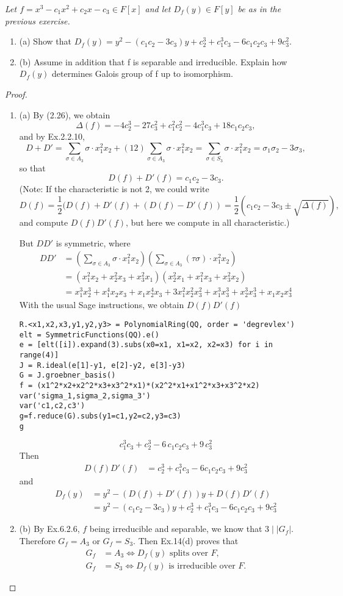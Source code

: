 \documentclass[11pt,a4paper]{article}
\newcommand{\be} {\begin{enumerate}}
\newcommand{\ee} {\end{enumerate}}
\begin{document}
{\it Let $f=x^3-c_1x^2+c_2x-c_3 \in F[x]$ and let $D_f(y) \in F[y]$ be as in the previous exercise.
\be
\item[(a)] Show that $D_f(y)=y^2-(c_1c_2-3c_3)y+c_2^3+c_1^3c_3-6c_1c_2c_3+9c_3^2$.
\item[(b)] Assume in addition that f is separable and irreducible. Explain how $D_f(y)$ determines Galois group of f up to isomorphism.
\ee

\begin{proof}
\be
\item[(a)] By (2.26), we obtain
$$\Delta(f)=-4c_2^3-27c_3^2+c_1^2c_2^2-4c_1^3c_3+18c_1c_2c_3,$$
and by Ex.2.2.10,
 $$D+D'=\sum_{\sigma \in A_3}\sigma\cdot x_1^2x_2+(12)\sum_{\sigma \in A_3}\sigma\cdot x_1^2x_2=\sum_{\sigma \in S_3}\sigma\cdot x_1^2x_2=\sigma_1\sigma_2-3\sigma_3,$$ 
 so that
 $$D(f) + D'(f) = c_1c_2 - 3c_3.$$
(Note: If the characteristic is not 2, we could write
$$D(f) = \frac{1}{2}(D(f) + D'(f) + (D(f) - D'(f)) = \frac{1}{2}(c_1c_2 - 3c_3 \pm \sqrt{\Delta(f)}),$$
and compute $D(f)D'(f)$, but here we compute in all characteristic.)

But $DD'$ is symmetric, where
\begin{align*}
D D' &= \left(\sum_{\sigma \in A_3}\sigma\cdot x_1^2x_2\right)\left(\sum_{\sigma \in A_3}(\tau\sigma)\cdot x_1^2x_2\right)\\
&=(x_1^2x_2+x_2^2x_3+x_3^2x_1)(x_2^2x_1+x_1^2x_3+x_3^2x_2)\\
&=x_{1}^{3} x_{2}^{3} + x_{1}^{4} x_{2} x_{3} + x_{1} x_{2}^{4} x_{3} + 3 x_{1}^{2} x_{2}^{2} x_{3}^{2} + x_{1}^{3} x_{3}^{3} + x_{2}^{3}x_{3}^{3} + x_{1} x_{2} x_{3}^{4} 
\end{align*}
With the usual Sage instructions, we obtain $D(f)D'(f)$
\begin{verbatim}
R.<x1,x2,x3,y1,y2,y3> = PolynomialRing(QQ, order = 'degrevlex')
elt = SymmetricFunctions(QQ).e()
e = [elt([i]).expand(3).subs(x0=x1, x1=x2, x2=x3) for i in range(4)]
J = R.ideal(e[1]-y1, e[2]-y2, e[3]-y3)
G = J.groebner_basis()
f = (x1^2*x2+x2^2*x3+x3^2*x1)*(x2^2*x1+x1^2*x3+x3^2*x2)
var('sigma_1,sigma_2,sigma_3')
var('c1,c2,c3')
g=f.reduce(G).subs(y1=c1,y2=c2,y3=c3)
g
\end{verbatim}
$$c_{1}^{3} c_{3} + c_{2}^{3} - 6 \, c_{1} c_{2} c_{3} + 9 \, c_{3}^{2}$$
Then 
\begin{align*}
 D(f)D'(f) &= c_2^3+c_1^3c_3-6c_1c_2c_3+9c_3^2
\end{align*}
and 
\begin{align*}
D_f(y) &=y^2-(D(f)+D'(f))y+D(f)D'(f) \\
& =y^2-(c_1c_2-3c_3)y+c_2^3+c_1^3c_3-6c_1c_2c_3+9c_3^2
\end{align*}
\item[(b)] By Ex.6.2.6, $f$ being irreducible and separable, we know that $3 \mid |G_f|$. Therefore $G_f = A_3$ or $G_f = S_3$. Then Ex.14(d) proves that
\begin{align*}
G_f &= A_3 \iff D_f(y)\text{ splits over } F,\\
G_f &=S_3 \iff D_f(y) \text{ is irreducible over } F.
\end{align*}
\ee
\end{proof}
}
\end{document}
